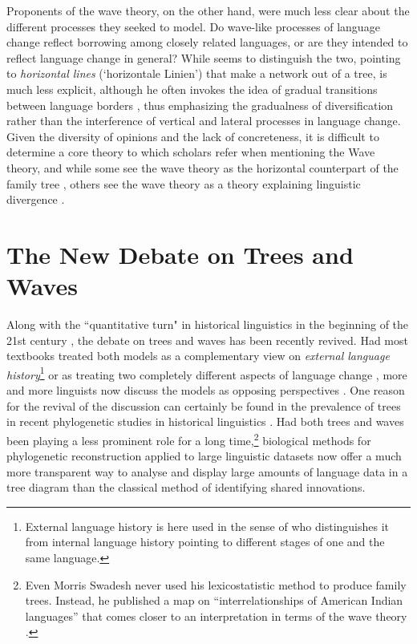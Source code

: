 \documentclass[svgnames,12pt]{scrartcl}
\begin{document}
{Proponents of the
wave theory, on the other hand, were much less clear about the different processes they seeked to
model. Do wave-like processes of language change reflect borrowing among closely related languages,
or are they intended to reflect language change in general? While \citet{Schuchardt1870} seems to distinguish
the two, pointing to \emph{horizontal lines} (`{horizontale Linien}') that make a network out of a
tree, \citet{Schmidt1872} is much less explicit, although he often invokes the idea of gradual
transitions between language borders \citep[200]{Schmidt1875}, thus emphasizing the gradualness of
diversification rather than the interference of vertical and lateral processes in language change.
Given the diversity of opinions and the lack of concreteness, it is
difficult to determine a core theory to which scholars refer when mentioning the Wave theory, and
while some see the wave theory as the horizontal counterpart of the family tree \citep[74]{Baxter2006a},
others see the wave theory as a theory explaining linguistic divergence
\citep[188-191]{Campbell1999}.

\section{The New Debate on Trees and Waves}
Along with the ``quantitative turn" in historical linguistics in the beginning of the 21st century
\citep[209f]{List2014d}, the debate on trees and waves has been recently revived. Had most textbooks
treated both models as a complementary view on \emph{external language history}\footnote{External
language history is here used in the sense of \citet{Gabelentz1891} who distinguishes it from
internal language history pointing to different stages of one and the same language.}
\citep{Lehmann1992,Anttila1972} or as treating two completely different aspects of language change
\citep{Campbell1999}, more and more linguists now  discuss the models as opposing perspectives
\citep{Heggarty2010,Francois2015}. One reason for the revival of the discussion can certainly be
found in the prevalence of trees in recent phylogenetic studies in historical linguistics
\citep{Gray2003,Atkinson2006,Ringe2002,Pagel2009}. Had both trees and waves been playing a less
prominent role for a long time,\footnote{Even Morris Swadesh never used his lexicostatistic method
to produce family trees. Instead, he published a map on ``interrelationships of American Indian
languages'' that comes closer to an interpretation in terms of the wave theory
\citep[23]{Swadesh1959}.} biological methods for phylogenetic reconstruction applied to large
linguistic datasets now offer a much more transparent way to analyse and display large amounts of
language data in a tree diagram than the classical method of identifying shared innovations.
 
}
\end{document}

